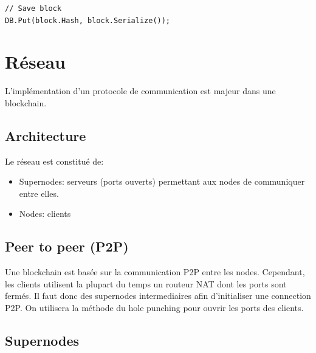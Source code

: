 \documentclass{article}
\begin{document}
\begin{verbatim}
// Save block
DB.Put(block.Hash, block.Serialize());
\end{verbatim}

\section{Réseau}
L'implémentation d'un protocole de communication est majeur dans une blockchain.

\subsection{Architecture}


\begin{center}
\end{center}

Le réseau est constitué de:
\begin{itemize}
    \item Supernodes: serveurs (ports ouverts) permettant aux nodes de communiquer entre elles.
    \item Nodes: clients
\end{itemize}

\subsection{Peer to peer (P2P)}

Une blockchain est basée sur la communication P2P entre les nodes.
Cependant, les clients utilisent la plupart du temps un routeur NAT dont les ports sont fermés.
Il faut donc des supernodes intermediaires afin d'initialiser une connection P2P.
On utilisera la méthode du hole punching pour ouvrir les ports des clients.

\subsection{Supernodes}
\end{document}
